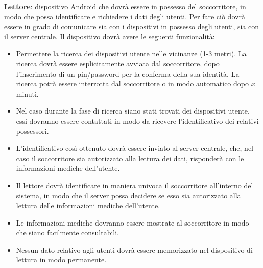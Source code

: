 \documentclass[a4paper,12pt]{report}
\begin{document}
\begin{description}
	\item \textbf{Lettore}: dispositivo Android che dovrà essere in possesso del soccorritore, in modo che possa identificare e richiedere i dati degli utenti. Per fare ciò dovrà essere in grado di comunicare sia con i dispositivi in possesso degli utenti, sia con il server centrale. Il dispositivo dovrà avere le seguenti funzionalità:
	\begin{itemize}
		\item Permettere la ricerca dei dispositivi utente nelle vicinanze (1-3 metri). La ricerca dovrà essere esplicitamente avviata dal soccorritore, dopo l'inserimento di un pin/password per la conferma della sua identità. La ricerca potrà essere interrotta dal soccorritore o in modo automatico dopo $x$ minuti.
		\item Nel caso durante la fase di ricerca siano stati trovati dei dispositivi utente, essi dovranno essere contattati in modo da ricevere l'identificativo dei relativi possessori.
		\item L'identificativo così ottenuto dovrà essere inviato al server centrale, che, nel caso il soccorritore sia autorizzato alla lettura dei dati, risponderà con le informazioni mediche dell'utente. 
		\item Il lettore dovrà identificare in maniera univoca il soccorritore all'interno del sistema, in modo che il server possa decidere se esso sia autorizzato alla lettura delle informazioni mediche dell'utente. 
		\item Le informazioni mediche dovranno essere mostrate al soccorritore in modo che siano facilmente consultabili.
		\item Nessun dato relativo agli utenti dovrà essere memorizzato nel dispositivo di lettura in modo permanente. 
	\end{itemize}


\end{description}
\end{document}

